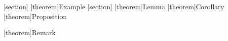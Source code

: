 \graphicspath{ {./Figures/} }

\def\newpar{\vspace{0.75em} \\   \hspace*{1.5em}}

\captionsetup{labelsep=space,labelfont=bf}
\renewcommand{\thefigure}{\arabic{chapter}.\arabic{figure}.}
\renewcommand{\thetable}{\arabic{chapter}.\arabic{table}.}

\long{}
\def\ds{\displaystyle}
\def\beqn{\begin{equation}}
\def\eeqn{\end{equation}}
\def\alignb{\begin{align}}
\def\aligne{\end{align}}


\theorembodyfont{\upshape}
[section]
[theorem]{Example}
\theorembodyfont{\itshape}
[section]
[theorem]{Lemma}
[theorem]{Corollary}
[theorem]{Proposition}
\newtheorem{assumption}{A\hspace{-4 pt}}
[theorem]{Remark}

\def\set#1{\lt\{ #1\ \rt\}}
\def\paren#1{\lt( #1 \rt)}
\def\yprime{\frac{dy}{dx}}
\def\indent{\hspace{18pt}}

\def\d#1{\partial\:#1}
\def\half{\frac{1}{2}}

\def\peso{{\rm P}\raisebox{2.5pt}{\kern-.74em{=}}}

\def\example#1{\noindent{\bf Example #1:}}
\def\examples{\noindent{\bf Examples:}}